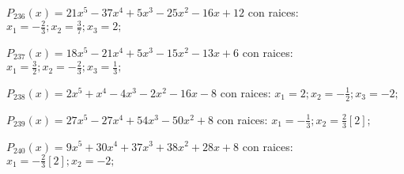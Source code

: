 \subitem $P_{236}(x) = 21x^5 - 37x^4 + 5x^3 - 25x^2 - 16x + 12$ con raices: $x_1 = -\frac{2}{3} ; x_2 = \frac{3}{7} ; x_3 = 2 ;  $

\subitem $P_{237}(x) = 18x^5 - 21x^4 + 5x^3 - 15x^2 - 13x + 6$ con raices: $x_1 = \frac{3}{2} ; x_2 = -\frac{2}{3} ; x_3 = \frac{1}{3} ;  $

\subitem $P_{238}(x) = 2x^5 + x^4 - 4x^3 - 2x^2 - 16x - 8$ con raices: $x_1 = 2 ; x_2 = -\frac{1}{2} ; x_3 = -2 ;  $

\subitem $P_{239}(x) = 27x^5 - 27x^4 + 54x^3 - 50x^2 + 8$ con raices: $x_1 = -\frac{1}{3} ; x_2 = \frac{2}{3}[2] ;  $

\subitem $P_{240}(x) = 9x^5 + 30x^4 + 37x^3 + 38x^2 + 28x + 8$ con raices: $x_1 = -\frac{2}{3}[2] ; x_2 = -2 ;  $

